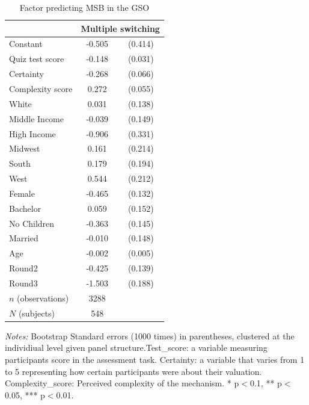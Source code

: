 \documentclass[12pt]{article}
\newcommand{\sym}[1]{\rlap{$^{#1}$}}
\begin{document}
\clearpage




\begin{table}[H]
        \centering
        \caption{Factor predicting MSB  in the GSO}    
        \label{tab:MSB_predictor1}
      \begin{tabular}{l*{1}{cc}}
      \hline \hline
            &\multicolumn{2}{c}{Multiple switching}    \\
            \hline
Constant    &      -0.505         &     (0.414)\\
Quiz test score  &      -0.148\sym{***}&     (0.031)\\
Certainty    &      -0.268\sym{***}&     (0.066)\\
Complexity score &       0.272\sym{***}&     (0.055)\\
White       &       0.031         &     (0.138)\\
Middle Income&      -0.039         &     (0.149)\\
High Income &      -0.906\sym{***}&     (0.331)\\
Midwest     &       0.161         &     (0.214)\\
South       &       0.179         &     (0.194)\\
West        &       0.544\sym{**} &     (0.212)\\
Female      &      -0.465\sym{***}&     (0.132)\\
Bachelor    &       0.059         &     (0.152)\\
No Children &      -0.363\sym{**} &     (0.145)\\
Married     &      -0.010         &     (0.148)\\
Age         &      -0.002         &     (0.005)\\
Round2      &      -0.425\sym{***}&     (0.139)\\
Round3      &      -1.503\sym{***}&     (0.188)\\
\hline
\(n\) (observations)      &        3288         &            \\
\(N\) (subjects)       &        548         &            \\
\hline \hline
\end{tabular}

\begin{tablenotes}
            \footnotesize
         \item \textit{Notes:} Bootstrap Standard errors (1000 times) in parentheses, clustered at the individiual level given panel structure.Test\_score: a variable measuring participants score in the assessment task. Certainty: a variable that varies from 1 to 5 representing how certain participants were about their valuation. Complexity\_score: Perceived complexity of the mechanism. * p$<$0.1, ** p$<$0.05, *** p$<$0.01.
        \end{tablenotes}
\end{table}
\end{document}
